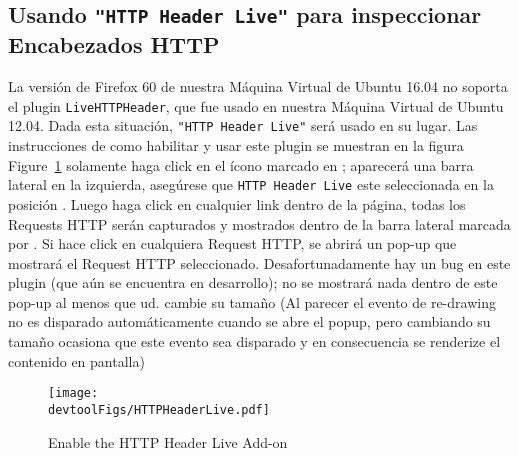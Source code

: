 
\newcommand{\devtoolFigs}{../Web_Common/Figs}


\subsection{Usando \texttt{"HTTP Header Live"} para inspeccionar Encabezados HTTP}
\label{web:sec:httpheaderlive}

La versión de Firefox 60 de nuestra Máquina Virtual de Ubuntu 16.04 no soporta el plugin \texttt{LiveHTTPHeader}, que fue usado en nuestra Máquina Virtual de Ubuntu 12.04.
Dada esta situación, \texttt{"HTTP Header Live"} será usado en su lugar.
Las instrucciones de como habilitar y usar este plugin se muestran en la figura Figure~\ref{web:fig:httpheader} solamente haga click en el ícono marcado en ; aparecerá una barra lateral en la izquierda, asegúrese que \texttt{HTTP Header Live} este seleccionada en la posición . Luego haga click en cualquier link dentro de la página, todas los Requests HTTP serán capturados y mostrados dentro de la barra lateral marcada por .
Si hace click en cualquiera Request HTTP, se abrirá un pop-up que mostrará el Request HTTP seleccionado. Desafortunadamente hay un bug en este plugin (que aún se encuentra en desarrollo); no se mostrará nada dentro de este pop-up al menos que ud. cambie su tamaño (Al parecer el evento de re-drawing no es disparado automáticamente cuando se abre el popup, pero cambiando su tamaño ocasiona que este evento sea disparado y en consecuencia se renderize el contenido en pantalla)


\begin{figure}[htb]
\begin{center}
\texttt{[image: \\devtoolFigs/HTTPHeaderLive.pdf]}
\end{center}
\caption{Enable the HTTP Header Live Add-on}
\label{web:fig:httpheader}
\end{figure}




